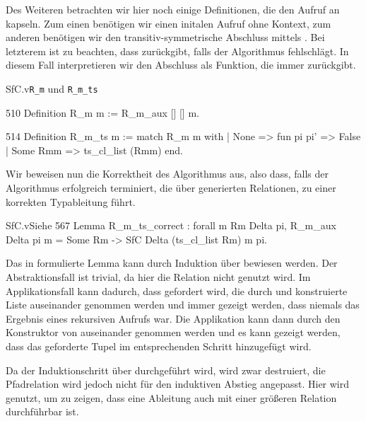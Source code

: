 Des Weiteren betrachten wir hier noch einige Definitionen, die den Aufruf an  kapseln. 
Zum einen benötigen wir einen initalen Aufruf ohne Kontext, zum anderen benötigen wir den transitiv-symmetrische Abschluss mittels . Bei letzterem ist zu beachten, dass   zurückgibt, falls der Algorithmus fehlschlägt. In diesem Fall interpretieren wir den Abschluss als Funktion, die immer  zurückgibt.
\begin{multicode}[R_m]{SfC.v}{}{\texttt{R\_m} und \texttt{R\_m\_ts}}
    \begin{mcode}{510}
Definition R_m m := R_m_aux [] [] m.
\end{mcode}
\begin{mcode}{514}
Definition R_m_ts m := match R_m m with
  | None => fun pi pi' => False
  | Some Rmm => ts_cl_list (Rmm)
end.
\end{mcode}
\end{multicode}

Wir beweisen nun die Korrektheit des Algorithmus aus, also dass, falls der Algorithmus erfolgreich terminiert, die über  generierten Relationen, zu einer korrekten Typableitung führt. 

\begin{code}[R_m_ts_correct]{SfC.v}{Siehe }{567}
Lemma R_m_ts_correct : forall m Rm Delta pi, 
    R_m_aux Delta pi m = Some Rm  -> 
      SfC Delta (ts_cl_list Rm) m pi.
\end{code}
Das in  formulierte Lemma kann durch Induktion über  bewiesen werden. Der Abstraktionsfall ist trivial, da hier die Relation nicht genutzt wird. Im Applikationsfall kann dadurch, dass  gefordert wird, die durch  und  konstruierte Liste auseinander genommen werden und immer gezeigt werden, dass niemals  das Ergebnis eines rekursiven Aufrufs war. Die Applikation kann dann durch den Konstruktor von  auseinander genommen werden und es kann gezeigt werden, dass das geforderte Tupel   im entsprechenden Schritt hinzugefügt wird. 

Da der Induktionschritt über  durchgeführt wird, wird zwar  destruiert, die Pfadrelation wird jedoch nicht für den induktiven Abstieg angepasst. Hier wird  genutzt, um zu zeigen, dass eine Ableitung auch mit einer größeren Relation durchführbar ist.

